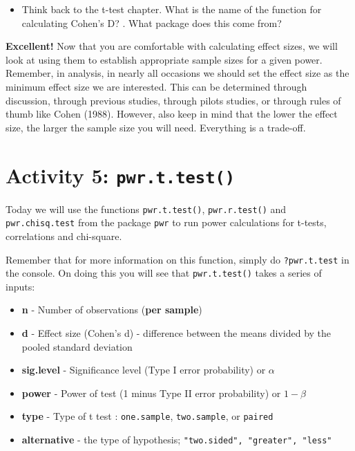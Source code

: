 \documentclass[]{book}
\providecommand{\tightlist}{%
  \setlength{\itemsep}{0pt}\setlength{\parskip}{0pt}}
\begin{document}
\begin{itemize}
\tightlist
\item
  Think back to the t-test chapter. What is the name of the function for calculating Cohen's D? . What package does this come from? 
\end{itemize}

\textbf{Excellent!} Now that you are comfortable with calculating effect sizes, we will look at using them to establish appropriate sample sizes for a given power. Remember, in analysis, in nearly all occasions we should set the effect size as the minimum effect size we are interested. This can be determined through discussion, through previous studies, through pilots studies, or through rules of thumb like Cohen (1988). However, also keep in mind that the lower the effect size, the larger the sample size you will need. Everything is a trade-off.

\hypertarget{activity-5-pwr.t.test}{%
\section{\texorpdfstring{Activity 5: \texttt{pwr.t.test()}}{Activity 5: pwr.t.test()}}\label{activity-5-pwr.t.test}}

Today we will use the functions \texttt{pwr.t.test()}, \texttt{pwr.r.test()} and \texttt{pwr.chisq.test} from the package \texttt{pwr} to run power calculations for t-tests, correlations and chi-square.

Remember that for more information on this function, simply do \texttt{?pwr.t.test} in the console. On doing this you will see that \texttt{pwr.t.test()} takes a series of inputs:

\begin{itemize}
\tightlist
\item
  \textbf{n} - Number of observations (\textbf{per sample})
\item
  \textbf{d} - Effect size (Cohen's d) - difference between the means divided by the pooled standard deviation
\item
  \textbf{sig.level} - Significance level (Type I error probability) or \(\alpha\)
\item
  \textbf{power} - Power of test (1 minus Type II error probability) or \(1-\beta\)
\item
  \textbf{type} - Type of t test : \texttt{one.sample}, \texttt{two.sample}, or \texttt{paired}
\item
  \textbf{alternative} - the type of hypothesis; \texttt{"two.sided",\ "greater",\ "less"}
\end{itemize}
\end{document}
